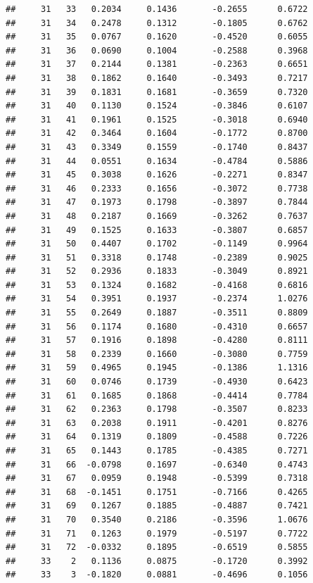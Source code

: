 \documentclass[
]{article}
\begin{document}
\begin{verbatim}
##     31   33   0.2034     0.1436       -0.2655      0.6722  
##     31   34   0.2478     0.1312       -0.1805      0.6762  
##     31   35   0.0767     0.1620       -0.4520      0.6055  
##     31   36   0.0690     0.1004       -0.2588      0.3968  
##     31   37   0.2144     0.1381       -0.2363      0.6651  
##     31   38   0.1862     0.1640       -0.3493      0.7217  
##     31   39   0.1831     0.1681       -0.3659      0.7320  
##     31   40   0.1130     0.1524       -0.3846      0.6107  
##     31   41   0.1961     0.1525       -0.3018      0.6940  
##     31   42   0.3464     0.1604       -0.1772      0.8700  
##     31   43   0.3349     0.1559       -0.1740      0.8437  
##     31   44   0.0551     0.1634       -0.4784      0.5886  
##     31   45   0.3038     0.1626       -0.2271      0.8347  
##     31   46   0.2333     0.1656       -0.3072      0.7738  
##     31   47   0.1973     0.1798       -0.3897      0.7844  
##     31   48   0.2187     0.1669       -0.3262      0.7637  
##     31   49   0.1525     0.1633       -0.3807      0.6857  
##     31   50   0.4407     0.1702       -0.1149      0.9964  
##     31   51   0.3318     0.1748       -0.2389      0.9025  
##     31   52   0.2936     0.1833       -0.3049      0.8921  
##     31   53   0.1324     0.1682       -0.4168      0.6816  
##     31   54   0.3951     0.1937       -0.2374      1.0276  
##     31   55   0.2649     0.1887       -0.3511      0.8809  
##     31   56   0.1174     0.1680       -0.4310      0.6657  
##     31   57   0.1916     0.1898       -0.4280      0.8111  
##     31   58   0.2339     0.1660       -0.3080      0.7759  
##     31   59   0.4965     0.1945       -0.1386      1.1316  
##     31   60   0.0746     0.1739       -0.4930      0.6423  
##     31   61   0.1685     0.1868       -0.4414      0.7784  
##     31   62   0.2363     0.1798       -0.3507      0.8233  
##     31   63   0.2038     0.1911       -0.4201      0.8276  
##     31   64   0.1319     0.1809       -0.4588      0.7226  
##     31   65   0.1443     0.1785       -0.4385      0.7271  
##     31   66  -0.0798     0.1697       -0.6340      0.4743  
##     31   67   0.0959     0.1948       -0.5399      0.7318  
##     31   68  -0.1451     0.1751       -0.7166      0.4265  
##     31   69   0.1267     0.1885       -0.4887      0.7421  
##     31   70   0.3540     0.2186       -0.3596      1.0676  
##     31   71   0.1263     0.1979       -0.5197      0.7722  
##     31   72  -0.0332     0.1895       -0.6519      0.5855  
##     33    2   0.1136     0.0875       -0.1720      0.3992  
##     33    3  -0.1820     0.0881       -0.4696      0.1056  

\end{verbatim}
\end{document}
